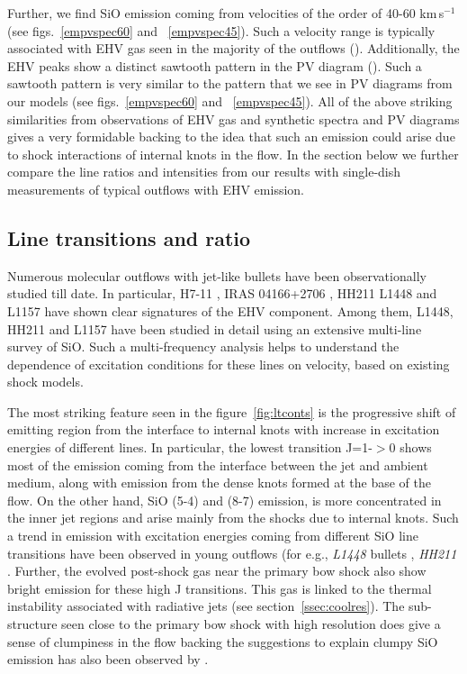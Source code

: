 \documentclass[useAMS,usenatbib]{mn2e}
\begin{document}
Further, we find SiO emission coming from velocities 
of the order of 40-60 km\,s$^{-1}$ (see figs.~\ref{empvspec60} and
~\ref{empvspec45}). Such a velocity range is typically associated with
EHV gas seen in the majority of the outflows (\citealt{Tafalla:2011p14051}). Additionally,
the EHV peaks show a distinct sawtooth pattern in the PV diagram
(\citealt{SantiagoGarcia:2009p13972}). Such a sawtooth pattern is very
similar to the pattern that we see in PV diagrams from
our models (see figs.~\ref{empvspec60} and ~\ref{empvspec45}). 
All of the above striking similarities from observations of EHV gas
and synthetic spectra and PV diagrams gives a very formidable backing
to the idea that such an emission could arise due to shock interactions of
internal knots in the flow. In the section below we further compare
the line ratios and intensities from our results with single-dish
measurements of typical outflows with EHV emission.

\subsection{Line transitions and ratio}
Numerous molecular outflows with jet-like bullets have been
observationally studied till date. In particular, H7-11
\citep{Bachiller:1998p14725}, IRAS 04166+2706
\citep{SantiagoGarcia:2009p13972, Tafalla:2010p14759}, HH211 \citep{Nisini:2002p14418}
L1448 \citep{Bachiller:1991p14732,Nisini:2007p13128,
  Tafalla:2010p14759} and L1157 \citep{Nisini:2007p13128} have
shown clear signatures of the EHV component. Among them, L1448, HH211 and
L1157 have been studied in detail using an extensive multi-line
survey of SiO. Such a multi-frequency analysis helps to understand the dependence of
excitation conditions for these lines on velocity, based on existing shock
models.  
%

The most striking feature seen in the figure~\ref{fig:ltconts} is the progressive shift of
emitting region from the interface to internal knots with increase in
excitation energies of different lines. In particular, the lowest
transition J=1-$>$0 shows most of the emission coming from the
interface between the jet and ambient medium, along with emission from
the dense knots formed at the base of the flow. On the other hand, SiO (5-4) and (8-7) emission, 
is more concentrated in the inner jet regions and arise mainly from
the shocks due to internal knots. Such a trend in emission with excitation energies coming from different SiO line transitions
have been observed in young outflows (for e.g., {\it{L1448}}
bullets \citep{Nisini:2007p13128}, {\it{HH211}}
\citep{Chandler:2001p14376, Nisini:2002p14418,
  Hirano:2006p14411}. Further, the evolved post-shock gas near the
primary bow shock also show bright emission for these high J transitions. 
This gas is linked to the thermal instability associated with
radiative jets (see section~\ref{ssec:coolres}). The sub-structure seen close to the
primary bow shock with high resolution does give a sense of clumpiness
in the flow backing the suggestions to explain clumpy SiO emission has
also been observed by \cite{Chandler:2001p14376}.
%
\end{document}
